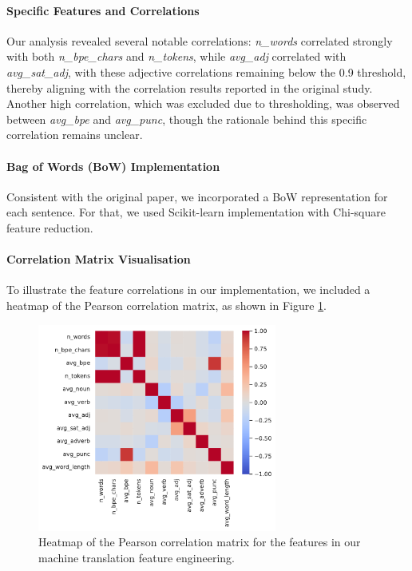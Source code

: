 \paragraph{Specific Features and Correlations}
Our analysis revealed several notable correlations: \textit{n\_words} correlated strongly with both \textit{n\_bpe\_chars} and \textit{n\_tokens}, while \textit{avg\_adj} correlated with \textit{avg\_sat\_adj}, with these adjective correlations remaining below the 0.9 threshold, thereby aligning with the correlation results reported in the original study. Another high correlation, which was excluded due to thresholding, was observed between \textit{avg\_bpe} and \textit{avg\_punc}, though the rationale behind this specific correlation remains unclear.

\paragraph{Bag of Words (BoW) Implementation}
Consistent with the original paper, we incorporated a BoW representation for each sentence. For that, we used Scikit-learn implementation with Chi-square feature reduction.

\paragraph{Correlation Matrix Visualisation}
To illustrate the feature correlations in our implementation, we included a heatmap of the Pearson correlation matrix, as shown in Figure \ref{fig:nlp_correlation_matrix}.
\begin{figure}[h]
	\centering
	\includegraphics[width=0.7\textwidth]{figures/text_corr_matrix1.pdf}
	\caption{Heatmap of the Pearson correlation matrix for the features in our machine translation feature engineering.}
	\label{fig:nlp_correlation_matrix}
\end{figure}

